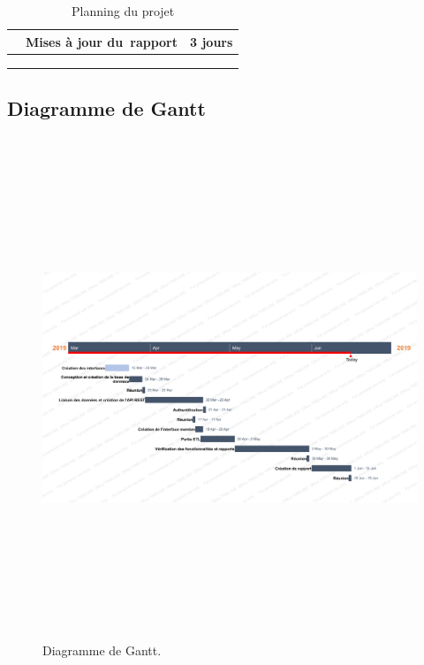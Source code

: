 \begin{table}
\begin{tabular}{|l|l|l|}
\cline{2-3}
                                & Mises à jour du~rapport                                                                                                                        & 3 jours               \\
\hline
\multicolumn{1}{l}{}            & \multicolumn{1}{l}{}                                                                                                                           & \multicolumn{1}{l}{}  \\
\multicolumn{1}{l}{}            & \multicolumn{1}{l}{}                                                                                                                           & \multicolumn{1}{l}{}  \\
\multicolumn{1}{l}{}            & \multicolumn{1}{l}{}                                                                                                                           & \multicolumn{1}{l}{}
\end{tabular}
\centering
\caption{ Planning du projet}
\end{table}


\subsection{Diagramme de Gantt}


\begin{figure}[H]

\begin{center}
\includegraphics[width=17cm,height=15cm]{./figures/gantt.png}
\caption{Diagramme de Gantt.}
\end{center}
\end {figure}
